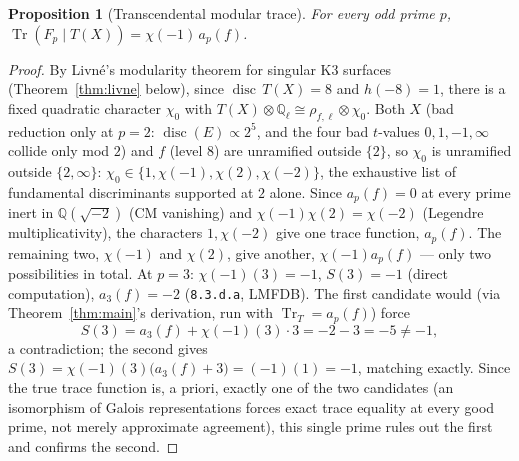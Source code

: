 \documentclass[11pt]{amsart}
\newtheorem{proposition}[theorem]{Proposition}
\theoremstyle{definition}
\newcommand{\Q}{\mathbb{Q}}
\DeclareMathOperator{\Tr}{Tr}
\DeclareMathOperator{\disc}{disc}
\begin{document}
\begin{proposition}[Transcendental modular trace]
\label{prop:trt}
For every odd prime $p$, $\Tr(F_p\mid T(X))=\chi(-1)\,a_p(f)$.
\end{proposition}

\begin{proof}
By Livn\'e's modularity theorem for singular K3 surfaces (Theorem~\ref{thm:livne} below), since $\disc\,T(X)=8$ and $h(-8)=1$, there is a fixed quadratic character $\chi_0$ with $T(X)\otimes\Q_\ell\cong\rho_{f,\ell}\otimes\chi_0$. Both $X$ (bad reduction only at $p=2$: $\disc(E)\propto2^5$, and the four bad $t$-values $0,1,-1,\infty$ collide only mod $2$) and $f$ (level $8$) are unramified outside $\{2\}$, so $\chi_0$ is unramified outside $\{2,\infty\}$: $\chi_0\in\{1,\chi(-1),\chi(2),\chi(-2)\}$, the exhaustive list of fundamental discriminants supported at $2$ alone. Since $a_p(f)=0$ at every prime inert in $\Q(\sqrt{-2})$ (CM vanishing) and $\chi(-1)\chi(2)=\chi(-2)$ (Legendre multiplicativity), the characters $1,\chi(-2)$ give one trace function, $a_p(f)$.
The remaining two, $\chi(-1)$ and $\chi(2)$, give another, $\chi(-1)a_p(f)$ — only two possibilities in total. At $p=3$: $\chi(-1)(3)=-1$, $S(3)=-1$ (direct computation), $a_3(f)=-2$ (\texttt{8.3.d.a}, LMFDB). The first candidate would (via Theorem~\ref{thm:main}'s derivation, run with $\Tr_T=a_p(f)$) force
\[
S(3)=a_3(f)+\chi(-1)(3)\cdot3=-2-3=-5\neq-1,
\]
a contradiction; the second gives $S(3)=\chi(-1)(3)\bigl(a_3(f)+3\bigr)=(-1)(1)=-1$, matching exactly. Since the true trace function is, a priori, exactly one of the two candidates (an isomorphism of Galois representations forces exact trace equality at every good prime, not merely approximate agreement), this single prime rules out the first and confirms the second.
\end{proof}
\end{document}
